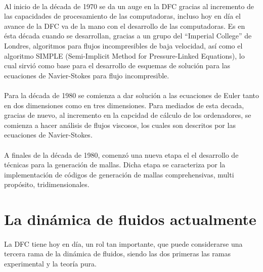 \documentclass[letterpaper, openright, 12pt]{book}
\begin{document}
            \paragraph*{}
                Al inicio de la década de 1970 se da un auge en la DFC gracias
                al incremento de las capacidades de procesamiento de las
                computadoras, incluso hoy en día el avance de la DFC va de la
                mano con el desarrollo de las computadoras.\cite{blazek} Es en
                ésta década cuando se desarrollan, gracias a un grupo del
                ``Imperial College'' de Londres, algoritmos para flujos
                incompresibles de baja velocidad, así como el algoritmo SIMPLE
                (Semi-Implicit Method for Pressure-Linked Equations), lo cual
                sirvió como base para el desarrollo de esquemas de solución para
                las ecuaciones de Navier-Stokes para flujo incompresible.\cite{pletcher-CFD-HeatTransfer}

            \paragraph*{}
                Para la década de 1980 se comienza a dar solución a las
                ecuaciones de Euler tanto en dos dimensiones como en tres
                dimensiones. Para mediados de esta decada, gracias de nuevo,
                al incremento en la capcidad de cálculo de los ordenadores,
                se comienza a hacer análisis de flujos viscosos, los cuales son
                descritos por las ecuaciones de Navier-Stokes.\cite{blazek}

            \paragraph*{}
                A finales de la década de 1980, comenzó una nueva etapa el el
                desarrollo de técnicas para la generación de mallas. Dicha etapa
                se caracteriza por la implementación de códigos de generación de
                mallas comprehensivas, multi propósito, tridimensionales.\cite{liseikin1999grid}

        \section{La dinámica de fluidos actualmente}
            \paragraph*{}
                La DFC tiene hoy en día, un rol tan importante, que puede
                considerarse una tercera rama de la dinámica de fluidos, siendo
                las dos primeras las ramas experimental y la teoría pura.\cite{anderson-yotros}
\end{document}
